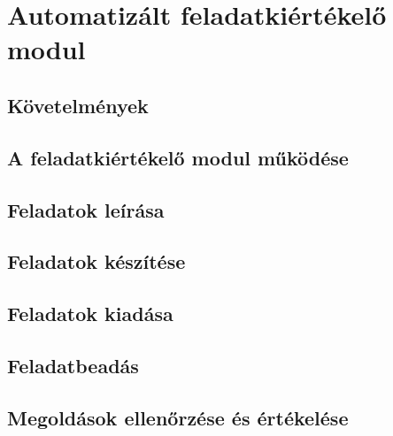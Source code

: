 \chapter{Automatizált feladatkiértékelő modul}\label{chapter:exercise}


\section{Követelmények}

\section{A feladatkiértékelő modul működése}

\section{Feladatok leírása}

\section{Feladatok készítése}

\section{Feladatok kiadása}

\section{Feladatbeadás}

\section{Megoldások ellenőrzése és értékelése}


